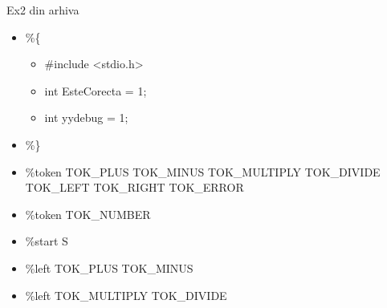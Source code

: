 \documentclass[pdf]{beamer}
\begin{document}
\begin{frame}{Ex2 din arhiva}
\begin{itemize}
	\item[]
	\%\{
	
	\begin{itemize}
		\item[]
		\#include <stdio.h>
		
		\item[]
		int EsteCorecta = 1;
			\linebreak

		\item[]
		int yydebug = 1;

	\end{itemize}
	
	\item[]
	\%\}
		\linebreak

	\item[]
	\%token TOK\_PLUS TOK\_MINUS TOK\_MULTIPLY TOK\_DIVIDE TOK\_LEFT TOK\_RIGHT TOK\_ERROR

	\item[]
	\%token TOK\_NUMBER
		\linebreak

	\item[]
	\%start S
		\linebreak

	\item[]
	\%left TOK\_PLUS TOK\_MINUS

	\item[]
	\%left TOK\_MULTIPLY TOK\_DIVIDE
	
\end{itemize}
\end{frame}
\end{document}
